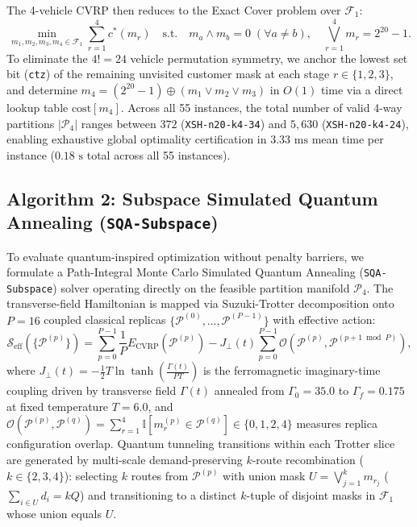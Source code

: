 \documentclass[10pt,a4paper]{article}
\begin{document}
The 4-vehicle CVRP then reduces to the Exact Cover problem over $\mathcal{F}_1$:
\begin{equation}
  \min_{m_1, m_2, m_3, m_4 \in \mathcal{F}_1} \sum_{r=1}^{4} c^*(m_r) \quad \text{s.t.} \quad m_a \wedge m_b = 0 \; (\forall a \neq b), \quad \bigvee_{r=1}^{4} m_r = 2^{20}-1.
\end{equation}
To eliminate the $4! = 24$ vehicle permutation symmetry, we anchor the lowest set bit (\texttt{ctz}) of the remaining unvisited customer mask at each stage $r \in \{1,2,3\}$, and determine $m_4 = (2^{20}-1) \oplus (m_1 \vee m_2 \vee m_3)$ in $O(1)$ time via a direct lookup table $\text{cost}[m_4]$. Across all 55 instances, the total number of valid 4-way partitions $|\mathcal{P}_4|$ ranges between $372$ (\texttt{XSH-n20-k4-34}) and $5,630$ (\texttt{XSH-n20-k4-24}), enabling exhaustive global optimality certification in $3.33\text{ ms}$ mean time per instance ($0.18\text{ s}$ total across all 55 instances).

\subsection{Algorithm 2: Subspace Simulated Quantum Annealing (\texttt{SQA-Subspace})}

To evaluate quantum-inspired optimization without penalty barriers, we formulate a Path-Integral Monte Carlo Simulated Quantum Annealing (\texttt{SQA-Subspace}) solver operating directly on the feasible partition manifold $\mathcal{P}_4$. The transverse-field Hamiltonian is mapped via Suzuki-Trotter decomposition onto $P=16$ coupled classical replicas $\{\mathcal{P}^{(0)}, \dots, \mathcal{P}^{(P-1)}\}$ with effective action:
\begin{equation}
  \mathcal{S}_{\text{eff}}\left(\{\mathcal{P}^{(p)}\}\right) = \sum_{p=0}^{P-1} \frac{1}{P} E_{\text{CVRP}}\left(\mathcal{P}^{(p)}\right) - J_{\perp}(t) \sum_{p=0}^{P-1} \mathcal{O}\left(\mathcal{P}^{(p)}, \mathcal{P}^{(p+1 \bmod P)}\right),
\end{equation}
where $J_{\perp}(t) = -\frac{1}{2} T \ln \tanh\left(\frac{\Gamma(t)}{P T}\right)$ is the ferromagnetic imaginary-time coupling driven by transverse field $\Gamma(t)$ annealed from $\Gamma_0 = 35.0$ to $\Gamma_f = 0.175$ at fixed temperature $T = 6.0$, and $\mathcal{O}(\mathcal{P}^{(p)}, \mathcal{P}^{(q)}) = \sum_{r=1}^4 \mathbb{I}[m_r^{(p)} \in \mathcal{P}^{(q)}] \in \{0,1,2,4\}$ measures replica configuration overlap. Quantum tunneling transitions within each Trotter slice are generated by multi-scale demand-preserving $k$-route recombination ($k \in \{2,3,4\}$): selecting $k$ routes from $\mathcal{P}^{(p)}$ with union mask $U = \bigvee_{j=1}^k m_{r_j}$ ($\sum_{i \in U} d_i = kQ$) and transitioning to a distinct $k$-tuple of disjoint masks in $\mathcal{F}_1$ whose union equals $U$.
\end{document}
